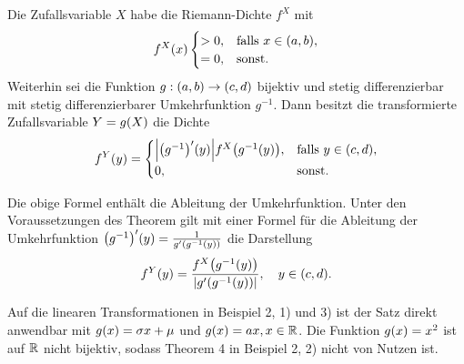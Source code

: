 \documentclass{lecture}
\begin{document}
    \begin{theorem}
        Die Zufallsvariable \(X\) habe die Riemann-Dichte \(f^X\) mit
        \[
            f^X\parentheses*{x}\begin{cases}
                > 0, & \text{falls }x \in \parentheses*{a, b},\\
                = 0, & \text{sonst}.
            \end{cases}
        \]
        Weiterhin sei die Funktion \(g: \parentheses*{a, b} \to \parentheses*{c, d}\) bijektiv und stetig differenzierbar mit stetig differenzierbarer Umkehrfunktion \(g^{-1}\).
        Dann besitzt die transformierte Zufallsvariable \(Y = g\parentheses*{X}\) die Dichte
        \[
            f^Y\parentheses*{y} = \begin{cases}
                \absolute*{\parentheses*{g^{-1}}'\parentheses*{y}}f^X\parentheses*{g^{-1}\parentheses*{y}}, & \text{falls }y \in \parentheses*{c, d},\\
                0, & \text{sonst}.
            \end{cases}
        \]
    \end{theorem}

    \begin{remark}
        Die obige Formel enthält die Ableitung der Umkehrfunktion.
        Unter den Voraussetzungen des Theorem gilt mit einer Formel für die Ableitung der Umkehrfunktion \(\parentheses*{g^{-1}}'\parentheses*{y} = \frac{1}{g'\parentheses*{g^{-1}\parentheses*{y}}}\) die Darstellung
        \[
            f^Y\parentheses*{y} = \frac{f^X\parentheses*{g^{-1}\parentheses*{y}}}{\absolute*{g'\parentheses*{g^{-1}\parentheses*{y}}}}, \quad y \in \parentheses*{c, d}.
        \]
    \end{remark}

    Auf die linearen Transformationen in Beispiel 2, 1) und 3) ist der Satz direkt anwendbar mit \(g\parentheses*{x} = \sigma x + \mu\) und \(g\parentheses*{x} = ax, x \in \R\).
    Die Funktion \(g\parentheses*{x} = x^2\) ist auf \(\R\) nicht bijektiv, sodass Theorem 4 in Beispiel 2, 2) nicht von Nutzen ist.
\end{document}
